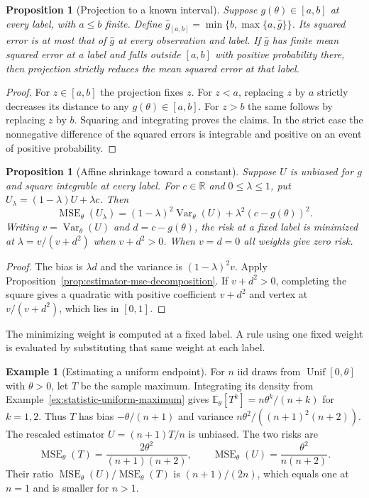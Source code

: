 \documentclass[11pt,oneside]{book}
\newtheorem{proposition}[theorem]{Proposition}
\theoremstyle{definition}
\newtheorem{example}[theorem]{Example}
\theoremstyle{remark}
\newcommand{\R}{\mathbb R}
\begin{document}
\begin{proposition}[Projection to a known interval]
\label{prop:estimator-interval-projection}
Suppose $g(\theta)\in[a,b]$ at every label, with $a\leq b$ finite.
Define $\widehat g_{[a,b]}=\min\{b,\max\{a,\widehat g\}\}$.
Its squared error is at most that of $\widehat g$ at every
observation and label. If $\widehat g$ has finite mean squared
error at a label and falls outside $[a,b]$ with positive probability
there, then projection strictly reduces the mean squared error
at that label.
\end{proposition}
\begin{proof}
For $z\in[a,b]$ the projection fixes $z$. For $z<a$, replacing $z$
by $a$ strictly decreases its distance to any $g(\theta)\in[a,b]$.
For $z>b$ the same follows by replacing $z$ by $b$.
Squaring and integrating proves the claims. In the strict case
the nonnegative difference of the squared errors is integrable
and positive on an event of positive probability.
\end{proof}

\begin{proposition}[Affine shrinkage toward a constant]
\label{prop:estimator-affine-shrinkage}
Suppose $U$ is unbiased for $g$ and square integrable at every
label. For $c\in\R$ and $0\leq\lambda\leq1$, put
$U_\lambda=(1-\lambda)U+\lambda c$. Then
\[
\operatorname{MSE}_\theta(U_\lambda)
=(1-\lambda)^2\operatorname{Var}_\theta(U)
+\lambda^2(c-g(\theta))^2.
\]
Writing $v=\operatorname{Var}_\theta(U)$ and $d=c-g(\theta)$,
the risk at a fixed label is minimized at
$\lambda=v/(v+d^2)$ when $v+d^2>0$. When $v=d=0$ all weights
give zero risk.
\end{proposition}
\begin{proof}
The bias is $\lambda d$ and the variance is $(1-\lambda)^2v$.
Apply Proposition~\ref{prop:estimator-mse-decomposition}.
If $v+d^2>0$, completing the square gives a quadratic with
positive coefficient $v+d^2$ and vertex at $v/(v+d^2)$, which
lies in $[0,1]$.
\end{proof}

The minimizing weight is computed at a fixed label. A rule using
one fixed weight is evaluated by substituting that same weight
at each label.

\begin{example}[Estimating a uniform endpoint]
\label{ex:mse-uniform-endpoint-comparison}
For $n$ iid draws from $\operatorname{Unif}[0,\theta]$ with
$\theta>0$, let $T$ be the sample maximum. Integrating its
density from Example~\ref{ex:statistic-uniform-maximum} gives
$\mathbb E_\theta[T^k]=n\theta^k/(n+k)$ for $k=1,2$.
Thus $T$ has bias $-\theta/(n+1)$ and variance
$n\theta^2/((n+1)^2(n+2))$. The rescaled estimator
$U=(n+1)T/n$ is unbiased. The two risks are
\[
\operatorname{MSE}_\theta(T)=\frac{2\theta^2}{(n+1)(n+2)},\qquad
\operatorname{MSE}_\theta(U)=\frac{\theta^2}{n(n+2)}.
\]
Their ratio $\operatorname{MSE}_\theta(U)/\operatorname{MSE}_\theta(T)$
is $(n+1)/(2n)$, which equals one at $n=1$ and is smaller for $n>1$.
\end{example}
\end{document}
